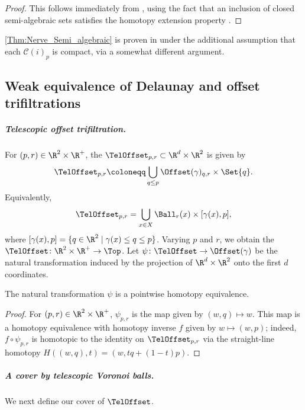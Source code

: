 %
\begin{proof}
This follows immediately from \cite[Theorem 5.9]{bauerUnifiedViewFunctorial2023}, using the fact that an inclusion of closed semi-algebraic sets satisfies the homotopy extension property \cite[Theorem 4]{delfs1984separation}.
\end{proof}
%
\begin{remark} \cref{Thm:Nerve_Semi_algebraic} is proven in \cite[Theorem 4.10]{bauerUnifiedViewFunctorial2023} under the additional assumption that each $\mathcal{C}(i)_p$ is compact, via a somewhat different argument.
\end{remark}
%
\subsection{Weak equivalence of Delaunay and offset trifiltrations}
%
\subparagraph{Telescopic offset trifiltration.} For $(p,r)\in\R^{2}\times \R^+$, the  $\TelOffset_{p,r} \subset \R^{d}\times \R^2$ is given by
\begin{equation}
  \TelOffset_{p,r} \coloneqq \bigcup_{q\leq p} \Offset(\gamma)_{q,r} \times \Set{q}.
\end{equation}
Equivalently, \[\TelOffset_{p,r}= \bigcup_{x\in X} \Ball_r(x)\times [\gamma(x),p],\] where $ [\gamma(x),p]=\{q\in \R^2\mid \gamma(x)\leq q\leq p\}$.  Varying $p$ and $r$, we obtain the 
$\TelOffset\colon \R^{2}\times\R^{+} \to \Top$.  %
Let $\psi\colon \TelOffset\to \Offset(\gamma)$ be the natural transformation induced by the projection of $\R^d\times \R^2$ onto the first $d$ coordinates. 
\begin{lemma}\label{prop:teloffset}
The natural transformation $\psi$ is a pointwise homotopy equivalence.
\end{lemma}
\begin{proof}
For $(p,r)\in \R^2\times \R^+$, $\psi_{p,r}$ is the map given by $(w,q)\mapsto w$.  This map is a homotopy equivalence with homotopy inverse $f$ given by $w\mapsto (w,p)$; indeed, $f \circ \psi_{p,r}$ is homotopic to the identity on $\TelOffset_{p,r}$ via the straight-line homotopy $H((w,q),t)=(w,tq+(1-t)p)$.
\end{proof}
%
%
\subparagraph{A cover by telescopic Voronoi balls.}
We next define our cover of $\TelOffset$.  %
